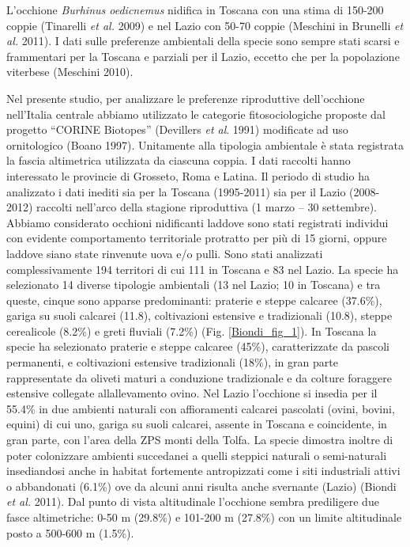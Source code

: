 L{\textquoteright}occhione \textit{Burhinus oedicnemus} nidifica in
Toscana con una stima di 150-200 coppie {(Tinarelli
}\textit{{et al.}}{ 2009)} e nel
Lazio con 50-70 coppie {(Meschini in Brunelli
}\textit{{et al.}}{ 2011)}. I dati
sulle preferenze ambientali della specie sono sempre stati scarsi e
frammentari per la Toscana e parziali per il Lazio, eccetto che per la
popolazione viterbese (Meschini 2010).

Nel presente studio, per analizzare le preferenze riproduttive
dell{\textquoteright}occhione nell{\textquoteright}Italia centrale
abbiamo utilizzato le categorie fitosociologiche proposte dal progetto
{\textquotedblleft}CORINE Biotopes{\textquotedblright} (Devillers
\textit{et al}. 1991) modificate ad uso ornitologico (Boano 1997).
Unitamente alla tipologia ambientale \`e stata registrata la fascia
altimetrica utilizzata da ciascuna coppia. I dati raccolti hanno
interessato le provincie di Grosseto, Roma e Latina. Il periodo di
studio ha analizzato i dati inediti sia per la Toscana (1995-2011) sia
per il Lazio (2008-2012) raccolti nell{\textquoteright}arco della
stagione riproduttiva (1{\textdegree} marzo -- 30 settembre). Abbiamo
considerato occhioni nidificanti laddove sono stati registrati
individui con evidente comportamento territoriale protratto per pi\`u
di 15 giorni, oppure laddove siano state rinvenute uova e/o pulli. Sono
stati analizzati complessivamente 194 territori di cui 111 in Toscana e
83 nel Lazio. La specie ha selezionato 14 diverse tipologie ambientali
(13 nel Lazio; 10 in Toscana) e tra queste, cinque sono apparse
predominanti: praterie e steppe calcaree (37.6\%), gariga su suoli
calcarei (11.8), coltivazioni estensive e tradizionali (10.8), steppe
cerealicole (8.2\%) e greti fluviali (7.2\%) (Fig. \ref{Biondi_fig_1}). In Toscana la
specie ha selezionato praterie e steppe calcaree (45\%), caratterizzate
da pascoli permanenti, e coltivazioni estensive tradizionali (18\%), in
gran parte rappresentate da oliveti maturi a conduzione tradizionale e
da colture foraggere estensive collegate
all{\textquotesingle}allevamento ovino. Nel Lazio
l{\textquoteright}occhione si insedia per il 55.4\% in due ambienti
naturali con affioramenti calcarei pascolati (ovini, bovini, equini) di
cui uno, gariga su suoli calcarei, assente in Toscana e coincidente, in
gran parte, con l{\textquoteright}area della ZPS monti della Tolfa. La
specie dimostra inoltre di poter colonizzare ambienti succedanei a
quelli steppici naturali o semi-naturali insediandosi anche in habitat
fortemente antropizzati come i siti industriali attivi o abbandonati
(6.1\%) ove da alcuni anni risulta anche svernante (Lazio) (Biondi
\textit{et al.} 2011). Dal punto di vista altitudinale
l{\textquoteright}occhione sembra prediligere due fasce altimetriche:
0-50 m (29.8\%) e 101-200 m (27.8\%) con un limite altitudinale posto a
500-600 m (1.5\%). 


